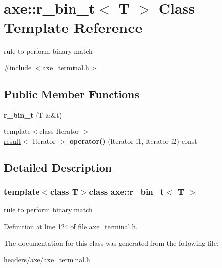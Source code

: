 \hypertarget{classaxe_1_1r__bin__t}{\section{axe\+:\+:r\+\_\+bin\+\_\+t$<$ T $>$ Class Template Reference}
\label{classaxe_1_1r__bin__t}
}


rule to perform binary match  




{\ttfamily \#include $<$axe\+\_\+terminal.\+h$>$}

\subsection*{Public Member Functions}
\begin{DoxyCompactItemize}
\item 
\hypertarget{classaxe_1_1r__bin__t_a3b7972b27e2fca265991f9f59fbdca44}{{\bfseries r\+\_\+bin\+\_\+t} (T \&\&t)}\label{classaxe_1_1r__bin__t_a3b7972b27e2fca265991f9f59fbdca44}

\item 
\hypertarget{classaxe_1_1r__bin__t_a9b0062fb521f107233769b5469a7d786}{{\footnotesize template$<$class Iterator $>$ }\\\hyperlink{structaxe_1_1result}{result}$<$ Iterator $>$ {\bfseries operator()} (Iterator i1, Iterator i2) const }\label{classaxe_1_1r__bin__t_a9b0062fb521f107233769b5469a7d786}

\end{DoxyCompactItemize}


\subsection{Detailed Description}
\subsubsection*{template$<$class T$>$class axe\+::r\+\_\+bin\+\_\+t$<$ T $>$}

rule to perform binary match 

Definition at line 124 of file axe\+\_\+terminal.\+h.



The documentation for this class was generated from the following file\+:\begin{DoxyCompactItemize}
\item 
headers/axe/axe\+\_\+terminal.\+h\end{DoxyCompactItemize}
